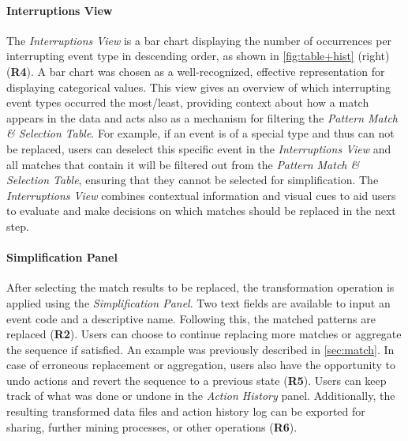\documentclass[camera]{vgtc}                          %
\begin{document}
\paragraph{Interruptions View}
The \textit{Interruptions View} is a bar chart displaying the number of occurrences per interrupting event type in descending order, as shown in \autoref{fig:table+hist} (right) (\textbf{R4}). 
A bar chart was chosen as a well-recognized, effective representation for displaying categorical values.
This view gives an overview of which interrupting event types occurred the most/least, providing context about how a match appears in the data and acts also as a mechanism for filtering the \textit{Pattern Match \& Selection Table}.
For example, if an event is of a special type and thus can not be replaced, users can deselect this specific event in the \textit{Interruptions View} and all matches that contain it will be filtered out from the \textit{Pattern Match \& Selection Table}, ensuring that they cannot be selected for simplification.
The \textit{Interruptions View} combines contextual information and visual cues to aid users to evaluate and make decisions on which matches should be replaced in the next step.

\paragraph{Simplification Panel}
After selecting the match results to be replaced, the transformation operation is applied using the \textit{Simplification Panel}. Two text fields are available to input an event code and a descriptive name. Following this, the matched patterns are replaced (\textbf{R2}). Users can choose to continue replacing more matches or aggregate the sequence if satisfied. An example was previously described in \autoref{sec:match}. In case of erroneous replacement or aggregation, users also have the opportunity to undo actions and revert the sequence to a previous state (\textbf{R5}). Users can keep track of what was done or undone in the \textit{Action History} panel. Additionally, the resulting transformed data files and action history log can be exported for sharing, further mining processes, or other operations (\textbf{R6}). 
\end{document}
